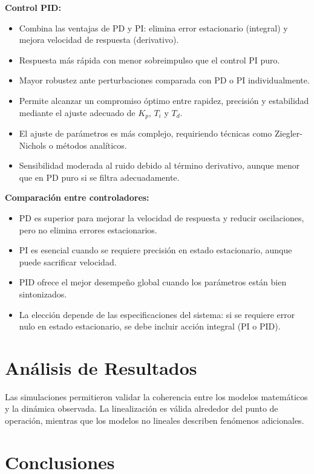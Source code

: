 \documentclass[conference]{IEEEtran}
\begin{document}
\textbf{Control PID:}
\begin{itemize}
\item Combina las ventajas de PD y PI: elimina error estacionario (integral) y mejora velocidad de respuesta (derivativo).
\item Respuesta más rápida con menor sobreimpulso que el control PI puro.
\item Mayor robustez ante perturbaciones comparada con PD o PI individualmente.
\item Permite alcanzar un compromiso óptimo entre rapidez, precisión y estabilidad mediante el ajuste adecuado de $K_p$, $T_i$ y $T_d$.
\item El ajuste de parámetros es más complejo, requiriendo técnicas como Ziegler-Nichols o métodos analíticos.
\item Sensibilidad moderada al ruido debido al término derivativo, aunque menor que en PD puro si se filtra adecuadamente.
\end{itemize}

\textbf{Comparación entre controladores:}
\begin{itemize}
\item PD es superior para mejorar la velocidad de respuesta y reducir oscilaciones, pero no elimina errores estacionarios.
\item PI es esencial cuando se requiere precisión en estado estacionario, aunque puede sacrificar velocidad.
\item PID ofrece el mejor desempeño global cuando los parámetros están bien sintonizados.
\item La elección depende de las especificaciones del sistema: si se requiere error nulo en estado estacionario, se debe incluir acción integral (PI o PID).
\end{itemize}

\FloatBarrier


\section{Análisis de Resultados}

Las simulaciones permitieron validar la coherencia entre los modelos matemáticos y la dinámica observada. La linealización es válida alrededor del punto de operación, mientras que los modelos no lineales describen fenómenos adicionales.

\section{Conclusiones}
\end{document}
